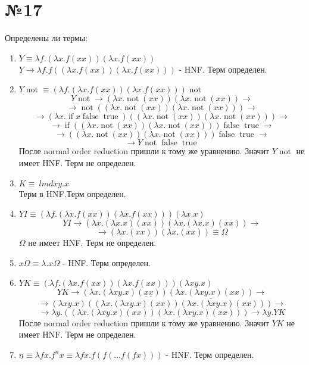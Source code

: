 \documentclass[a4paper,14pt]{scrreprt}
\newcommand{\lmd}{\lambda}
\newcommand{\un}[1]{\underline{#1}}
\DeclareMathOperator{\false}{false}
\DeclareMathOperator{\true}{true}
\DeclareMathOperator{\mif}{if}
\DeclareMathOperator{\mnot}{not}
\begin{document}
\section*{№17}
Определены ли термы:
\begin{enumerate}
	\item $Y \equiv \lmd f.(\lmd x.f(xx))(\lmd x.f(xx))$ \\
	$Y \to \lmd f.f((\lmd x.f(xx))(\lmd x.f(xx)))$ - HNF. Терм определен.
	
	\item $Y \mnot \equiv (\lmd f.(\lmd x.f(xx))(\lmd x.f(xx))) \mnot$
		$$ Y\mnot \to (\lmd x.\mnot(xx))(\lmd x.\mnot(xx)) \to $$
		$$ \to  \mnot((\lmd x.\mnot(xx))(\lmd x.\mnot(xx))) \to $$
		$$ \to  (\lmd x.\mif x \false\true)((\lmd x.\mnot(xx))(\lmd x.\mnot(xx))) \to $$
		$$ \to  \mif ((\lmd x.\mnot(xx))(\lmd x.\mnot(xx))) \false\true\to $$
		$$ \to ((\lmd x.\mnot(xx))(\lmd x.\mnot(xx))) \false\true \to $$
		$$ \to   Y\mnot \false \true $$
	После normal order reduction пришли к тому же уравнению. Значит $Y \mnot $ не имеет HNF. Терм не определен.

	\item $K \equiv\ lmd xy.x$ \\ Терм в HNF.Терм определен.
	
	\item $YI \equiv (\lmd f.(\lmd x.f(xx))(\lmd x.f(xx)))(\lmd x.x)$
		$$ YI \to (\lmd x.(\lmd x.x)(xx))(\lmd x.(\lmd x.x)(xx)) \to $$
		$$ \to  (\lmd x.(xx)) (\lmd x.(xx)) \equiv \Omega $$
	$\Omega$ не имеет HNF. Терм не определен.
	
	\item $x\Omega \equiv \lmd.x\Omega$ - HNF. Терм определен.
	
	\item $YK\equiv(\lmd f.(\lmd x.f(xx))(\lmd x.f(xx)))(\lmd xy.x)$
	$$ YK\to(\lmd x.(\lmd xy.x)(\un{x} \un{x} )) \un{(\lmd x.(\lmd xy.x)(xx))} \to $$
	$$ \to (\lmd xy.x) ((\lmd x.(\lmd xy.x)(xx))(\lmd x.(\lmd xy.x)(xx))) \to $$
	$$ \to \lmd y. ((\lmd x.(\lmd xy.x)(xx))(\lmd x.(\lmd xy.x)(xx))) \to \lmd y.YK$$
	После normal order reduction пришли к тому же уравнению. Значит $YK$ не имеет HNF. Терм не определен.
	
	\item $\un{n} \equiv \lmd fx.f^n x \equiv \lmd fx.f(f(\dots f(fx)))$ - HNF. Терм определен.

\end{enumerate}
\end{document}
